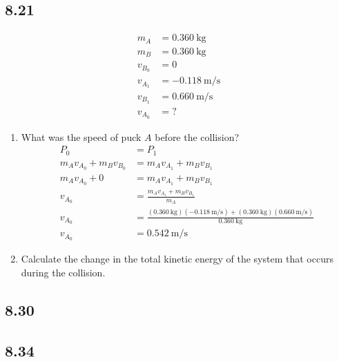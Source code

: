 \documentclass{article}
\begin{document}
\subsection{8.21}

\begin{align*}
	m_A & = \SI{0.360}{\kilogram} \\
	m_B & = \SI{0.360}{\kilogram} \\
	v_{B_0} & = 0 \\
	v_{A_1} & = \SI{-0.118}{\meter \per \second} \\
	v_{B_1} & = \SI{0.660}{\meter \per \second} \\
	v_{A_0} & = ?
\end{align*}
\begin{enumerate}[label = \textbf{(\alph*)}]
	\item What was the speed of puck $ A $ before the collision?
		\begin{align*}
			P_0 & = P_1 \\
			m_A v_{A_0} + m_B v_{B_0} & = m_A v_{A_1} + m_B v_{B_1} \\
			m_A v_{A_0} + 0 & = m_A v_{A_1} + m_B v_{B_1} \\
			v_{A_0} & = \frac{ m_A v_{A_1} + m_B v_{B_1} }{ m_A } \\
			v_{A_0} & = \frac{ (\SI{0.360}{\kilogram})(\SI{-0.118}{\meter \per \second}) + (\SI{0.360}{\kilogram})(\SI{0.660}{\meter \per \second}) }{ \SI{0.360}{\kilogram} } \\
			v_{A_0} & = \SI{0.542}{\meter \per \second}
		\end{align*}
	\item Calculate the change in the total kinetic energy of the system that occurs during the collision.
\end{enumerate}

\subsection{8.30}

\subsection{8.34}
\end{document}
